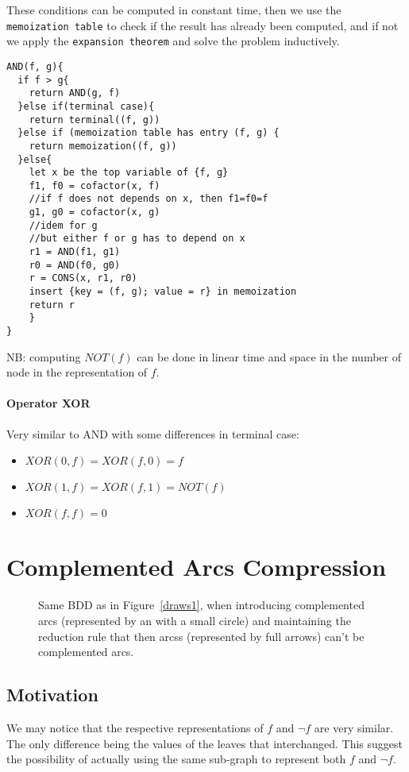 \documentclass[a4paper,10pt]{article}
\newcommand{\includeframe}[4]{\makebox[#2\linewidth]{\texttt{[image: \#4]}}}
\begin{document}
These conditions can be computed in constant time, then we use the \texttt{memoization table} to check if the result has already been computed, and if not we apply the \texttt{expansion theorem} and solve the problem inductively.

\begin{lstlisting}
AND(f, g){
  if f > g{
    return AND(g, f)
  }else if(terminal case){
    return terminal((f, g))
  }else if (memoization table has entry (f, g) {
    return memoization((f, g))
  }else{
    let x be the top variable of {f, g}
    f1, f0 = cofactor(x, f)
    //if f does not depends on x, then f1=f0=f
    g1, g0 = cofactor(x, g)
    //idem for g
    //but either f or g has to depend on x
    r1 = AND(f1, g1)
    r0 = AND(f0, g0)
    r = CONS(x, r1, r0)
    insert {key = (f, g); value = r} in memoization
    return r
    }
}
\end{lstlisting}

NB: computing $NOT(f)$ can be done in linear time and space in the number of node in the representation of $f$.

\paragraph{Operator XOR}
Very similar to AND with some differences in terminal case:\begin{itemize}
\item $XOR(0, f) = XOR(f, 0) = f$
\item $XOR(1, f) = XOR(f, 1) = NOT(f)$
\item $XOR(f, f) = 0$
\end{itemize}

\section{Complemented Arcs Compression}
\begin{figure}
\centering
\includeframe{2}{1}{}{draws.pdf}
\caption{Same BDD as in Figure~\ref{draws1}, when introducing complemented arcs (represented by an with a small circle) and maintaining the reduction rule that then arcss (represented by full arrows) can't be complemented arcs.}
\label{draws2}
\end{figure}

\subsection{Motivation}
We may notice that the respective representations of $f$ and $\lnot f$ are very similar. 
The only difference being the values of the leaves that interchanged.
This suggest the possibility of actually using the same sub-graph to represent both $f$ and $\lnot f$.
\end{document}
